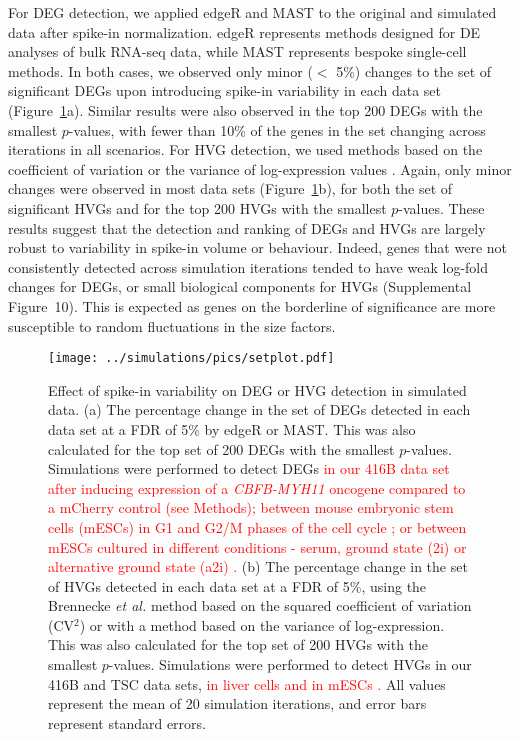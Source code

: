 \documentclass{article}
\newcommand{\suppfiglostsim}{10}
\newcommand{\revised}[1]{\textcolor{red}{#1}}
\begin{document}
For DEG detection, we applied edgeR \autocite{robinson2010edgeR} and MAST \autocite{finak2015mast} to the original and simulated data after spike-in normalization.
edgeR represents methods designed for DE analyses of bulk RNA-seq data, while MAST represents bespoke single-cell methods.
In both cases, we observed only minor ($<$ 5\%) changes to the set of significant DEGs upon introducing spike-in variability in each data set (Figure~\ref{fig:setchange}a). 
Similar results were also observed in the top 200 DEGs with the smallest $p$-values, with fewer than 10\% of the genes in the set changing across iterations in all scenarios.
For HVG detection, we used methods based on the coefficient of variation \autocite{brennecke2013accounting} or the variance of log-expression values \autocite{lun2016stepbystep}.
Again, only minor changes were observed in most data sets (Figure~\ref{fig:setchange}b), for both the set of significant HVGs and for the top 200 HVGs with the smallest $p$-values.
These results suggest that the detection and ranking of DEGs and HVGs are largely robust to variability in spike-in volume or behaviour.
Indeed, genes that were not consistently detected across simulation iterations tended to have weak log-fold changes for DEGs, or small biological components for HVGs (Supplemental Figure~\suppfiglostsim{}).
This is expected as genes on the borderline of significance are more susceptible to random fluctuations in the size factors.

\begin{figure}[btp]
    \begin{center}
        \texttt{[image: ../simulations/pics/setplot.pdf]}
    \end{center}
    \caption{Effect of spike-in variability on DEG or HVG detection in simulated data.
        (a) The percentage change in the set of DEGs detected in each data set at a FDR of 5\% by edgeR or MAST.
        This was also calculated for the top set of 200 DEGs with the smallest $p$-values.
        Simulations were performed to detect DEGs \revised{in our 416B data set after inducing expression of a \textit{CBFB-MYH11} oncogene compared to a mCherry control (see Methods);
        between mouse embryonic stem cells (mESCs) in G1 and G2/M phases of the cell cycle \autocite{buettner2015computational};
        or between mESCs cultured in different conditions - serum, ground state (2i) or alternative ground state (a2i) \autocite{grun2014validation,kolod2015single}.}
        (b) The percentage change in the set of HVGs detected in each data set at a FDR of 5\%,
        using the Brennecke \textit{et al.} method based on the squared coefficient of variation (CV$^2$) or with a method based on the variance of log-expression.
        This was also calculated for the top set of 200 HVGs with the smallest $p$-values.
        Simulations were performed to detect HVGs in our 416B and TSC data sets, \revised{in liver cells \autocite{scialdone2015computational} and in mESCs \autocite{kolod2015single}.}
        All values represent the mean of 20 simulation iterations, and error bars represent standard errors.
    }
    \label{fig:setchange}
\end{figure}
\end{document}
